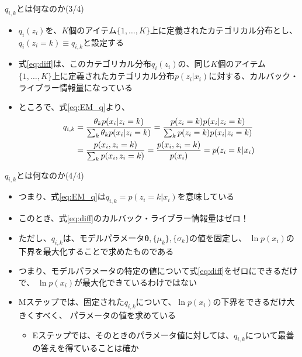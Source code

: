 \documentclass[aspectratio=169,unicode,dvipdfmx,14pt]{beamer}
\begin{document}
\begin{frame}{$q_{i,k}$とは何なのか(3/4)}
\vspace{-.05in}
\begin{itemize}
\item $q_i(z_i)$を、$K$個のアイテム$\{1,\ldots,K\}$上に定義されたカテゴリカル分布とし、
$q_i(z_i=k) \equiv q_{i,k}$と設定する
\item 式\eqref{eq:diff}は、このカテゴリカル分布$q_i(z_i)$の、同じ$K$個のアイテム$\{1,\ldots,K\}$上に定義されたカテゴリカル分布$p(z_i|x_i)$に対する、カルバック・ライブラー情報量になっている
\item ところで、式\eqref{eq:EM_q}より、
\begin{align}
q_{i,k} & = \frac{ \theta_k p(x_i | z_i = k) }{ \sum_k \theta_k p(x_i | z_i = k) }
= \frac{p(z_i=k)p(x_i|z_i=k)}{\sum_k p(z_i=k)p(x_i|z_i=k)}
\notag \\ &
= \frac{p(x_i,z_i=k)}{\sum_k p(x_i,z_i=k)} = \frac{p(x_i,z_i=k)}{p(x_i)} = p(z_i=k|x_i)
\end{align}
\end{itemize}
\end{frame}

\begin{frame}{$q_{i,k}$とは何なのか(4/4)}
\begin{itemize}
\item つまり、式\eqref{eq:EM_q}は$q_{i,k} = p(z_i=k|x_i)$を意味している
\item このとき、式\eqref{eq:diff}のカルバック・ライブラー情報量はゼロ！
\item ただし、$q_{i,k}$は、モデルパラメータ$\bm{\theta},\{\mu_k\},\{\sigma_k\}$の値を固定し、
$\ln p(x_i)$の下界を最大化することで求めたものである
\item つまり、モデルパラメータの特定の値について式\eqref{eq:diff}をゼロにできるだけで、
$\ln p(x_i)$が最大化できているわけではない
\item Mステップでは、固定された$q_{i,k}$について、$\ln p(x_i)$の下界をできるだけ大きくすべく、
パラメータの値を求めている
\begin{itemize}
\item Eステップでは、そのときのパラメータ値に対しては、$q_{i,k}$について最善の答えを得ていることは確か
\end{itemize}
\end{itemize}
\end{frame}
\end{document}
